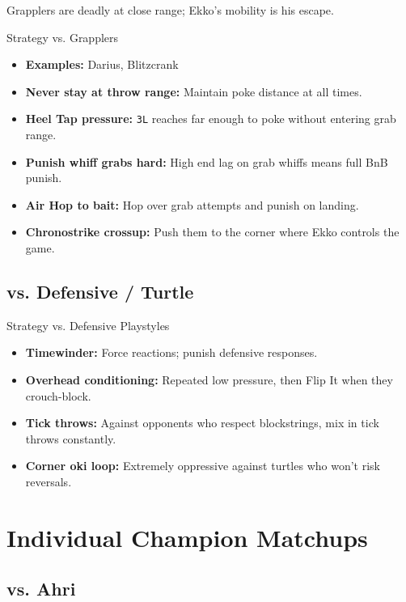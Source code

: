 \documentclass[12pt, a4paper]{report}
\newcommand{\notation}[1]{{\small\texttt{\textcolor{ekkoBlue}{#1}}}}
\newcommand{\champ}[1]{\textcolor{ekkoAccent}{\textbf{#1}}}
\begin{document}
Grapplers are deadly at close range; Ekko's mobility is his escape.

\begin{matchupbox}[]{Strategy vs. Grapplers}
\begin{itemize}
  \item \textbf{Examples:} Darius, Blitzcrank
  \item \textbf{Never stay at throw range:} Maintain poke distance at all times.
  \item \textbf{Heel Tap pressure:} \notation{3L} reaches far enough to poke without entering grab range.
  \item \textbf{Punish whiff grabs hard:} High end lag on grab whiffs means full BnB punish.
  \item \textbf{Air Hop to bait:} Hop over grab attempts and punish on landing.
  \item \textbf{Chronostrike crossup:} Push them to the corner where Ekko controls the game.
\end{itemize}
\end{matchupbox}

\section{vs. Defensive / Turtle}

\begin{matchupbox}[]{Strategy vs. Defensive Playstyles}
\begin{itemize}
  \item \textbf{Timewinder:} Force reactions; punish defensive responses.
  \item \textbf{Overhead conditioning:} Repeated low pressure, then Flip It when they crouch-block.
  \item \textbf{Tick throws:} Against opponents who respect blockstrings, mix in tick throws constantly.
  \item \textbf{Corner oki loop:} Extremely oppressive against turtles who won't risk reversals.
\end{itemize}
\end{matchupbox}

\chapter{Individual Champion Matchups}

\section{vs. \champ{Ahri}}
\end{document}
